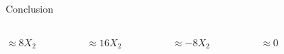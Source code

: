 \begin{frame}{Conclusion}
\begin{columns}[T, totalwidth = \textwidth]
\begin{column}{0.45\textwidth}
\begin{columns}[T, totalwidth = \linewidth]
\begin{column}{0.175\linewidth}
             \centering
                 $\approx 8X_2$ %
             \end{column}
            \begin{column}{0.225\linewidth}
    \centering
                $\approx 16X_2$ %
             \end{column}
            \begin{column}{0.225\linewidth}
            \centering
                $ \approx -8X_2$ %
             \end{column}        
             \begin{column}{0.225\linewidth}
             \centering
                 $\approx 0$%
             \end{column}
            \begin{column}{0.025\linewidth}
    
             \end{column}
         \end{columns}
        \end{column}
    
    \end{columns}
    \bigskip
    \end{frame}
    
    
    
    
    
    